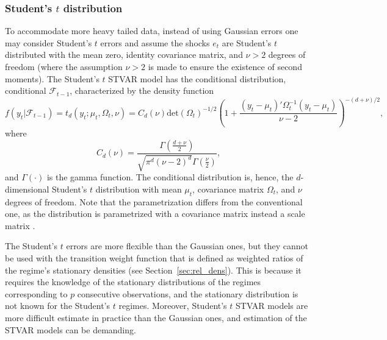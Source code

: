 \documentclass[nojss]{jss}
\begin{document}
\subsubsection{Student's $t$ distribution}\label{sec:student}
To accommodate more heavy tailed data, instead of using Gaussian errors one may consider Student's $t$ errors and assume the shocks $e_t$ are Student's $t$ distributed with the mean zero, identity covariance matrix, and $\nu>2$ degrees of freedom (where the assumption $\nu>2$ is made to ensure the existence of second moments). The Student's $t$ STVAR model has the conditional distribution, conditional $\mathcal{F}_{t-1}$, characterized by the density function
\begin{equation}
f(y_t|\mathcal{F}_{t-1}) = t_d(y_t;\mu_t,\Omega_t,\nu)=C_d(\nu)\text{det}(\Omega_t)^{-1/2}\left(1+\frac{(y_t -\mu_t)'\Omega_t^{-1}(y_t - \mu_t)}{\nu-2}\right)^{-(d+\nu)/2},
\end{equation}
where
\begin{equation}
C_d(\nu)=\frac{\Gamma\left(\frac{d+\nu}{2}\right)}{\sqrt{\pi^d(\nu-2)^d}\Gamma\left(\frac{\nu}{2}\right)},
\end{equation}
and $\Gamma\left(\cdot\right)$ is the gamma function. The conditional distribution is, hence, the $d$-dimensional Student's $t$ distribution with mean $\mu_t$, covariance matrix $\Omega_t$, and $\nu$ degrees of freedom. Note that the parametrization differs from the conventional one, as the distribution is parametrized with a covariance matrix instead a scale matrix \cite[see, e.g.,][Appendix~A for details about the parametrization]{Meitz+Preve+Saikkonen:2023}.

The Student's $t$ errors are more flexible than the Gaussian ones, but they cannot be used with the transition weight function that is defined as weighted ratios of the regime's stationary densities (see Section~\ref{sec:rel_dens}). This is because it requires the knowledge of the stationary distributions of the regimes corresponding to $p$ consecutive observations, and the stationary distribution is not known for the Student's $t$ regimes. Moreover, Student's $t$ STVAR models are more difficult estimate in practice than the Gaussian ones, and estimation of the STVAR models can be demanding.
\end{document}
